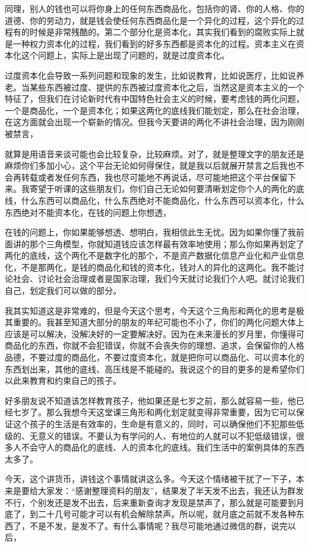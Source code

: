 \documentclass[UTF8, 12pt, a4paper]{ctexrep}
\begin{document}
同理，别人的钱也可以将你身上的任何东西商品化，包括你的肾、你的人格、你的道德、你的劳动力，就是钱会使任何东西商品化是一个异化的过程，这个异化的过程有的时候是非常残酷的。第二个部分化是资本化，其实我们看到的腐败实际上就是一种权力资本化的过程，我们看到的好多东西都是资本化的过程。资本主义在资本化这个问题上，实际上是出现了问题的，就是过度资本化。

过度资本化会导致一系列问题和现象的发生，比如说教育，比如说医疗，比如说养老。当某些东西被过度、提供的东西被过度资本化之后，当然这是资本主义的一个特征了，但我们在讨论新时代有中国特色社会主义的时候，要考虑钱的两化问题，一个是商品化，一个是资本化；如果这两化的底线我们能划定，那么在社会治理，在这方面就会出现一个崭新的情况。但我今天要讲的两化不讲社会治理，因为刚刚被禁言，

就算是用语音来谈可能也会比较复杂，比较麻烦。对了，就是整理文字的朋友还是麻烦你们多加小心，这个平台无论如何得保住，就是我以后就展开禁言之后我也不会再转载或者发任何东西，我也尽可能地不再说话，尽可能地把这个平台保留下来。我寄望于听课的这些朋友们，你们自己无论如何要清晰划定你个人的两化的底线，什么东西可以商品化，什么东西绝对不能商品化，什么东西可以资本化，什么东西绝对不能资本化，在钱的问题上你想透，

在钱的问题上，你如果能够想透、想明白，我相信此生无忧。因为如果你懂了我前面讲的那个三角模型，你就知道钱应该怎样最有效率地使用；那么你如果再划定了两化的底线，这个两化不是数字化的那个，不是资产数据化信息产业化和产业信息化，不是那两化，是钱的商品化和钱的资本化，钱对人的异化的这两化。我不能讨论社会、讨论社会治理或者是国家治理，我们今天就讨论我们个人吧。就讨论我们自己，划定我们可以做的部分。

我其实知道这是非常难的，但是今天这个思考，今天这个三角形和两化的思考是极其重要的。我甚至知道大部分的朋友的年纪可能也不小了，你们的两化问题大体上应该是可以解决，没解决好的一定要解决好。因为在未来漫长的岁月里，你懂得可商品化的东西，你就不会犯错误，你就不会丧失你的理想、追求，会保留你的人格品德，不要过度的商品化，不要过度资本化，就是把你可以商品化、可以资本化的东西划出来，其他的底线、高压线是不能碰的。我说这个的目的更多的是希望你们以此来教育和约束自己的孩子。

好多朋友说不知道该怎样教育孩子，他如果还是七岁之前，那么就容易一些，他已经七岁了。那么我想今天这堂课三角形和两化划定就变得非常重要，因为它可以保证这个孩子的生活是有效率的，生命是有意义的，同时，可以确保他们不犯那些低级的、无意义的错误。不要认为有学问的人、有地位的人就可以不犯低级错误，很多人不会守人的商品化的底线、人的资本化的底线。我们生活中的案例具体的东西太多了。

今天，这个讲货币，讲钱这个事情就讲这么多。今天这个情绪被干扰了一下子，本来是要给大家发：“感谢整理资料的朋友”，结果发了半天发不出去，我还认为群发不行，个别发还是发不出去，后来重新查询才发现是禁声了，那么就是可能要到月底了，到二十几号可能才可以有机会解除禁声。所以呢，就月底之前就不发各种东西了，不是不发，是发不了。有什么事情呢？我尽可能地通过微信的群，说完以后，
\end{document}
